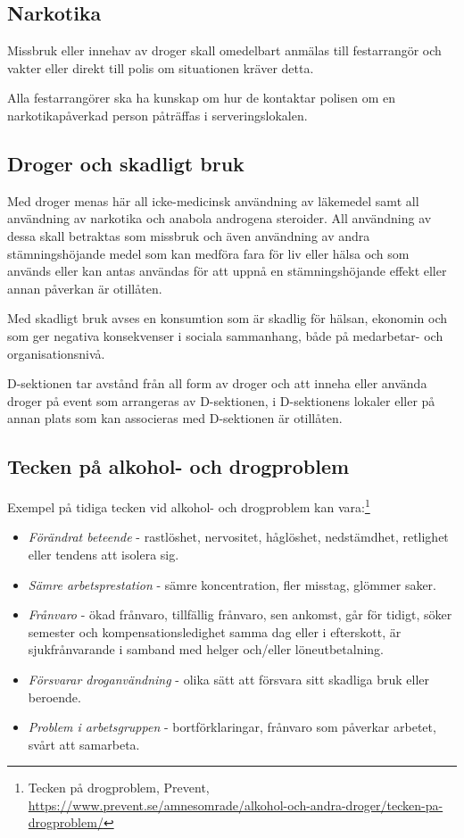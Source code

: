 \documentclass[]{dsekprotokoll}
\begin{document}
\subsection{Narkotika}
Missbruk eller innehav av droger skall omedelbart anmälas till festarrangör och vakter eller
direkt till polis om situationen kräver detta.

Alla festarrangörer ska ha kunskap om hur de kontaktar polisen om en narkotikapåverkad person påträffas i serveringslokalen.

\subsection{Droger och skadligt bruk}
Med droger menas här all icke-medicinsk användning av läkemedel samt all användning av
narkotika och anabola androgena steroider. All användning av dessa skall betraktas som
missbruk och även användning av andra stämningshöjande medel som kan medföra fara för
liv eller hälsa och som används eller kan antas användas för att uppnå en stämningshöjande
effekt eller annan påverkan är otillåten.

Med skadligt bruk avses en konsumtion som är skadlig för hälsan, ekonomin och som ger negativa konsekvenser i sociala sammanhang, både på medarbetar- och organisationsnivå.

D-sektionen tar avstånd från all form av droger och att inneha eller använda droger på event
som arrangeras av D-sektionen, i D-sektionens lokaler eller på annan plats som kan associeras med D-sektionen är otillåten.

\subsection{Tecken på alkohol- och drogproblem}
Exempel på tidiga tecken vid alkohol- och drogproblem kan vara:\footnote{Tecken på drogproblem, Prevent, \url{https://www.prevent.se/amnesomrade/alkohol-och-andra-droger/tecken-pa-drogproblem/}
}
\begin{itemize}
    \item \emph{Förändrat beteende} - rastlöshet, nervositet, håglöshet, nedstämdhet, retlighet eller tendens att isolera sig.
    \item \emph{Sämre arbetsprestation} - sämre koncentration, fler misstag, glömmer saker.
    \item \emph{Frånvaro} - ökad frånvaro, tillfällig frånvaro, sen ankomst, går för tidigt, söker semester och kompensationsledighet samma dag eller i efterskott, är sjukfrånvarande i samband med helger och/eller löneutbetalning.
    \item \emph{Försvarar droganvändning} - olika sätt att försvara sitt skadliga bruk eller beroende.
    \item \emph{Problem i arbetsgruppen} - bortförklaringar, frånvaro som påverkar arbetet, svårt att samarbeta.
\end{itemize}
\end{document}
